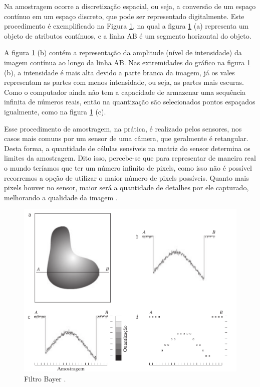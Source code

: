 \documentclass[
  brazilian,
]{book}
\begin{document}
Na amostragem ocorre a discretização espacial, ou seja, a conversão de um espaço contínuo em um espaço discreto, que pode ser representado digitalmente. Este procedimento é exemplificado na Figura \ref{fig:amostragemquant}, na qual a figura \ref{fig:amostragemquant} (a) representa um objeto de atributos contínuos, e a linha AB é um segmento horizontal do objeto.

A figura \ref{fig:amostragemquant} (b) contém a representação da amplitude (nível de intensidade) da imagem contínua ao longo da linha AB. Nas extremidades do gráfico na figura \ref{fig:amostragemquant} (b), a intensidade é mais alta devido a parte branca da imagem, já os vales representam as partes com menos intensidade, ou seja, as partes mais escuras. Como o computador ainda não tem a capacidade de armazenar uma sequência infinita de números reais, então na quantização são selecionados pontos espaçados igualmente, como na figura \ref{fig:amostragemquant} (c).

Esse procedimento de amostragem, na prática, é realizado pelos sensores, nos casos mais comuns por um sensor de uma câmera, que geralmente é retangular. Desta forma, a quantidade de células sensíveis na matriz do sensor determina os limites da amostragem. Dito isso, percebe-se que para representar de maneira real o mundo teríamos que ter um número infinito de pixels, como isso não é possível recorremos a opção de utilizar o maior número de pixels possíveis. Quanto mais pixels houver no sensor, maior será a quantidade de detalhes por ele capturado, melhorando a qualidade da imagem \autocite{gonzalez2010}.



\begin{figure}

{\centering \includegraphics[width=0.7\linewidth]{imagens/02-formacao/amostragemquant} 

}

\caption{Filtro Bayer \autocite[p.34]{gonzalez2010}.}\label{fig:amostragemquant}
\end{figure}
\end{document}
